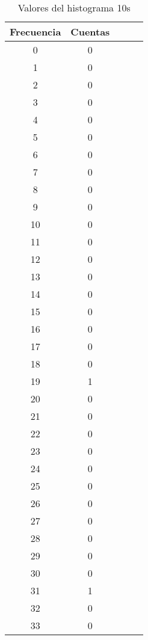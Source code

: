 \begin{center}
\begin{table}[H]
\caption{Valores del histograma 10s}
\label{Tab:histo_10s}
\begin{tabular}{ccccc}
\toprule
Frecuencia & Cuentas \\
\midrule
\num{    0} & \num{    0} \\
\num{    1} & \num{    0} \\
\num{    2} & \num{    0} \\
\num{    3} & \num{    0} \\
\num{    4} & \num{    0} \\
\num{    5} & \num{    0} \\
\num{    6} & \num{    0} \\
\num{    7} & \num{    0} \\
\num{    8} & \num{    0} \\
\num{    9} & \num{    0} \\
\num{   10} & \num{    0} \\
\num{   11} & \num{    0} \\
\num{   12} & \num{    0} \\
\num{   13} & \num{    0} \\
\num{   14} & \num{    0} \\
\num{   15} & \num{    0} \\
\num{   16} & \num{    0} \\
\num{   17} & \num{    0} \\
\num{   18} & \num{    0} \\
\num{   19} & \num{    1} \\
\num{   20} & \num{    0} \\
\num{   21} & \num{    0} \\
\num{   22} & \num{    0} \\
\num{   23} & \num{    0} \\
\num{   24} & \num{    0} \\
\num{   25} & \num{    0} \\
\num{   26} & \num{    0} \\
\num{   27} & \num{    0} \\
\num{   28} & \num{    0} \\
\num{   29} & \num{    0} \\
\num{   30} & \num{    0} \\
\num{   31} & \num{    1} \\
\num{   32} & \num{    0} \\
\num{   33} & \num{    0} \\

\end{tabular}
\end{table}
\end{center}
